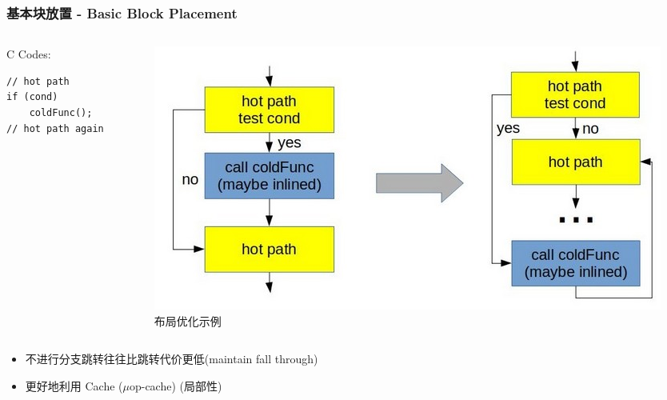 \begin{frame}[fragile]
\frametitle{基本块放置 - Basic Block Placement}

    \begin{columns}
        \begin{column}{0.3\textwidth}
            \centering
            C Codes:
            \begin{lstlisting}
// hot path
if (cond)
    coldFunc();
// hot path again\end{lstlisting}
        \end{column}
        \begin{column}{0.65\textwidth}
            \begin{figure}
                \centering
                \includegraphics[width=1.\textwidth]{images/hot_cold_placement.jpg}
                \caption{布局优化示例}
            \end{figure}
        \end{column}
    \end{columns}
    \begin{itemize}
        \item 不进行分支跳转往往比跳转代价更低(maintain fall through)
        \item 更好地利用 Cache ($\mu$op-cache) (局部性)
    \end{itemize}

\end{frame}

